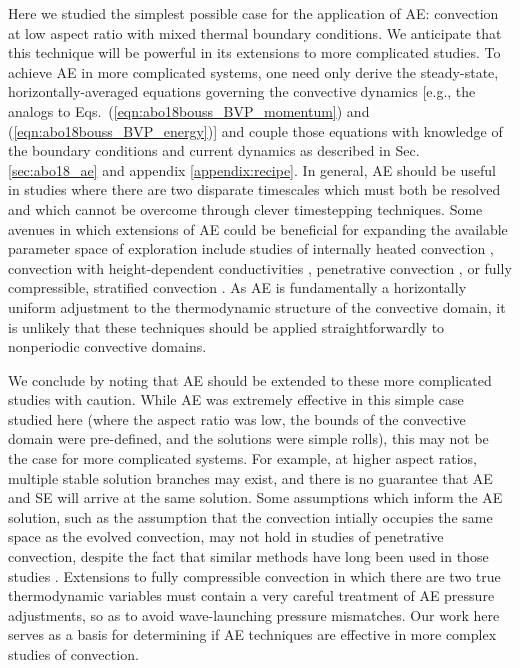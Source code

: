 Here we studied the simplest possible case for the application of AE: \RB convection at low aspect ratio with mixed thermal boundary conditions. 
We anticipate that this technique will be powerful in its extensions to more complicated studies.
To achieve AE in more complicated systems, one need only derive the steady-state, horizontally-averaged equations governing the convective dynamics [e.g., the analogs to Eqs.~(\ref{eqn:abo18bouss_BVP_momentum}) and (\ref{eqn:abo18bouss_BVP_energy})] and couple those equations with knowledge of the boundary conditions and current dynamics as described in Sec. \ref{sec:abo18_ae} and appendix \ref{appendix:recipe}.
In general, AE should be useful in studies where there are two disparate timescales which must both be resolved and which cannot be overcome through clever timestepping techniques.  
Some avenues in which extensions of AE could be beneficial for expanding the available parameter space of exploration include studies of internally heated convection \cite{goluskin2016}, convection with height-dependent conductivities \cite{kapyla&all2017}, penetrative convection \cite{hurlburt&all1986,brandenburg&all2005,couston&all2017}, or fully compressible, stratified convection \cite{anders&brown2017}.
As AE is fundamentally a horizontally uniform adjustment to the thermodynamic structure of the convective domain, it is unlikely that these techniques should be applied straightforwardly to nonperiodic convective domains.

We conclude by noting that AE should be extended to these more complicated studies with caution. 
While AE was extremely effective in this simple case studied here (where the aspect ratio was low,  the bounds of the convective domain were pre-defined, and the solutions were simple rolls), this may not be the case for more complicated systems. 
For example, at higher aspect ratios, multiple stable solution branches may exist, and there is no guarantee that AE and SE will arrive at the same solution. 
Some assumptions which inform the AE solution, such as the assumption that the convection intially occupies the same space as the evolved convection, may not hold in studies of penetrative convection, despite the fact that similar methods have long been used in those studies \cite{hurlburt&all1986}. 
Extensions to fully compressible convection in which there are two true thermodynamic variables \cite{anders&brown2017} must contain a very careful treatment of AE pressure adjustments, so as to avoid wave-launching pressure mismatches.
Our work here serves as a basis for determining if AE techniques are effective in more complex studies of convection.


